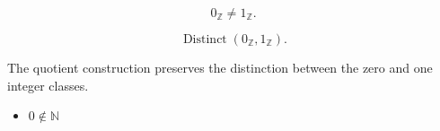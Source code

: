 \begin{remark*}
\[
0_{\mathbb{Z}}\ne 1_{\mathbb{Z}}.
\]
\end{remark*}

\begin{remark*}
\[
\operatorname{Distinct}(0_{\mathbb{Z}},1_{\mathbb{Z}}).
\]
\end{remark*}

\begin{remark*}[Interpretation]
The quotient construction preserves the distinction between the zero and one
integer classes.
\end{remark*}

\begin{dependencies}
\begin{itemize}
  \item \hyperref[thm:zero-not-in-n]{$0\notin\mathbb{N}$}
\end{itemize}
\end{dependencies}
